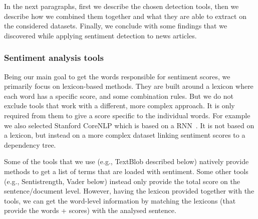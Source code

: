 In the next paragraphs, first we describe the chosen detection tools, then we describe how we combined them together and what they are able to extract on the considered datasets. Finally, we conclude with some findings that we discovered while applying sentiment detection to news articles. %

\subsubsection{\statusgreen Sentiment analysis tools}

Being our main goal to get the words responsible for sentiment scores, we primarily focus on lexicon-based methods.
They are built around a lexicon where each word has a specific score, and some combination rules. But we do not exclude tools that work with a different, more complex approach. It is only required from them to give a score specific to the individual words. For example we also selected Stanford CoreNLP which is based on a RNN~\citep{socher2013recursive}.
It is not based on a lexicon, but instead on a more complex dataset linking sentiment scores to a dependency tree.

Some of the tools that we use (e.g., TextBlob described below) natively provide methods to get a list of terms that are loaded with sentiment.
Some other tools (e.g., Sentistrength, Vader below) instead only provide the total score on the sentence/document level.
However, having the lexicon provided together with the tools, we can get the word-level information by matching the lexicons (that provide the words + scores) with the analysed sentence.

